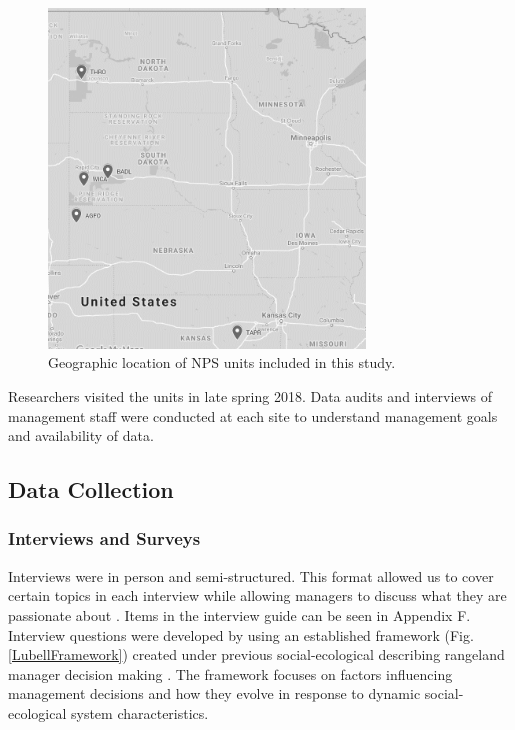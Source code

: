 \begin{figure}[th]
	\centering
\includegraphics[width=0.75\textwidth]{figures/RegionMapGoogle.png}\caption[Map of Midwest NPS units.]{Geographic location of NPS units included in this study.} \label{RegionMap}
\end{figure}

Researchers visited the units in late spring 2018. 
Data audits and interviews of management staff were conducted at each site to understand management goals and availability of data.

\hypertarget{data-collection}{%
	\subsection{Data Collection}\label{data-collection}}

\subsubsection{Interviews and Surveys} 
Interviews were in person and semi-structured. 
This format allowed us to cover certain topics in each
interview while allowing managers to discuss what they are passionate about \citep{creswell2003, montello2012}. 
Items in the interview guide can be seen in Appendix F. Interview questions were developed by using an established framework (Fig. \ref{LubellFramework}) created under previous
social-ecological describing rangeland manager decision making \citep{lubell2013}. 
The framework focuses on factors influencing management decisions and how they evolve in response to dynamic social- ecological system characteristics.

